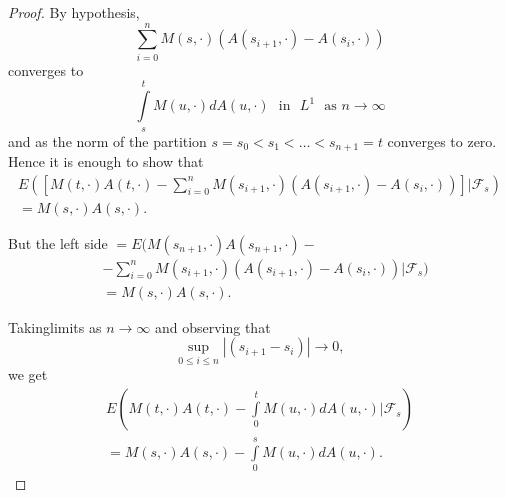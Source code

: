 \begin{proof}
By hypothesis,
$$
\sum\limits^{n}_{i=0}M(s,\cdot)(A(s_{i+1},\cdot)-A(s_{i},\cdot))
$$
converges to
$$
\int\limits^{t}_{s}M(u,\cdot)dA(u,\cdot)\text{~ in~ }L^{1}\text{~ as~
} n\to \infty
$$
and as the norm of the partition $s=s_{0}<s_{1}<\ldots<s_{n+1}=t$
converges to zero. Hence it is enough to show that
\begin{gather*}
E([M(t,\cdot)A(t,\cdot)-\sum\limits^{n}_{i=0}M(s_{i+1},\cdot)(A(s_{i+1},\cdot)-A(s_{i},\cdot))]|\mathscr{F}_{s})\\ 
=M(s,\cdot)A(s,\cdot).
\end{gather*}

But the left side $=E(M(s_{n+1},\cdot)A(s_{n+1},\cdot)-$
\begin{align*}
&
  -\sum\limits^{n}_{i=0}M(s_{i+1},\cdot)(A(s_{i+1},\cdot)-A(s_{i},\cdot))|\mathscr{F}_{s})\\ 
& = M(s,\cdot)A(s,\cdot).
\end{align*}

Taking\pageoriginale limits as $n\to \infty$ and observing that
$$
\sup\limits_{0\leq i\leq n}|(s_{i+1}-s_{i})|\to 0,
$$
we get
\begin{gather*}
E(M(t,\cdot)A(t,\cdot)-\int\limits^{t}_{0}M(u,\cdot)dA(u,\cdot)|\mathscr{F}_{s})\\
=M(s,\cdot)A(s,\cdot)-\int\limits^{s}_{0}M(u,\cdot)dA(u,\cdot).
\end{gather*}
\end{proof}

\newpage


